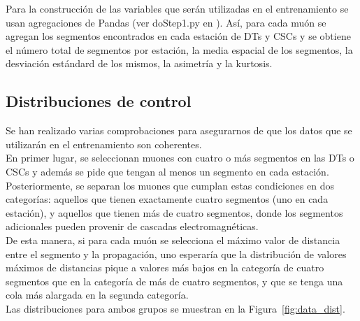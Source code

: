 Para la construcci\'on de las variables que ser\'an utilizadas en el entrenamiento se usan agregaciones de Pandas (ver doStep1.py en \cite{processor}). As\'i, para cada mu\'on se agregan los segmentos encontrados en cada estaci\'on de DTs y CSCs y se obtiene el n\'umero total de segmentos por estaci\'on, la media espacial de los segmentos, la desviaci\'on est\'andard de los mismos, la asimetr\'ia y la kurtosis.



\subsection{Distribuciones de control}\label{sec:plots}

Se han realizado varias comprobaciones para asegurarnos de que los datos que se utilizar\'an en el entrenamiento son coherentes. \\

En primer lugar, se seleccionan muones con cuatro o m\'as segmentos en las DTs o CSCs y adem\'as se pide que tengan al menos un segmento en cada estaci\'on. Posteriormente, se separan los muones que cumplan estas condiciones en dos categor\'ias: aquellos que tienen exactamente cuatro segmentos (uno en cada estaci\'on), y aquellos que tienen m\'as de cuatro segmentos, donde los segmentos adicionales pueden provenir de cascadas electromagn\'eticas. \\
De esta manera, si para cada mu\'on se selecciona el m\'aximo valor de distancia entre el segmento y la propagaci\'on, uno esperar\'ia que la distribuci\'on de valores m\'aximos de distancias pique a valores m\'as bajos en la categor\'ia de cuatro segmentos que en la categor\'ia de m\'as de cuatro segmentos, y que se tenga una cola m\'as alargada en la segunda categor\'ia. \\
Las distribuciones para ambos grupos se muestran en la Figura~\ref{fig:data_dist}. \\

